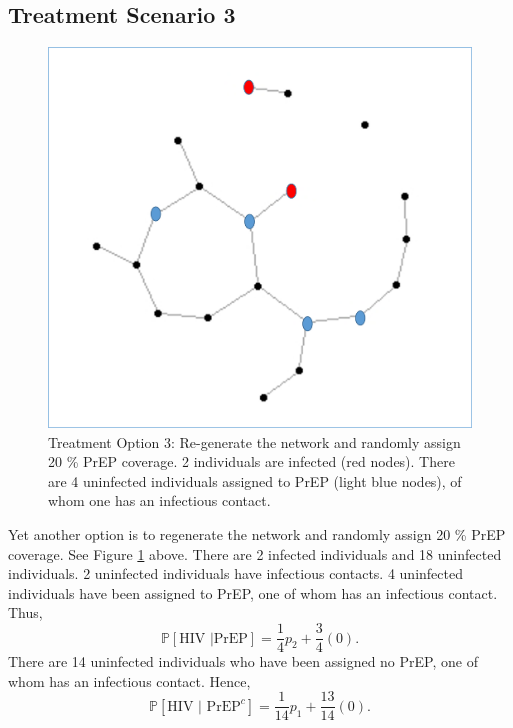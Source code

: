 \documentclass{article}
\theoremstyle{definition}
\begin{document}
\subsection{Treatment Scenario 3}
\begin{figure}[H]
    \centering
    \includegraphics[scale=0.5]{Figures/Network Example 5.png}
    \caption{Treatment Option 3: Re-generate the network and randomly assign 20 \% PrEP coverage. 2 individuals are infected (red nodes). There are 4 uninfected individuals assigned to PrEP (light blue nodes), of whom one has an infectious contact. }
    \label{fig:Figure 6}
\end{figure}

Yet another option is to regenerate the network and randomly assign 20 \% PrEP coverage. See Figure \ref{fig:Figure 6} above. There are 2 infected individuals and 18 uninfected individuals. 2 uninfected individuals have infectious contacts. 4 uninfected individuals have been assigned to PrEP, one of whom has an infectious contact. Thus, $$\mathbb{P}\left[\text{HIV } \vert \text{PrEP}\right]=\frac{1}{4}p_{2}+\frac{3}{4}\left(0\right).$$
There are 14 uninfected individuals who have been assigned no PrEP, one of whom has an infectious contact. Hence, $$\mathbb{P}\left[\text{HIV } \vert \text{ PrEP}^{c}\right]=\frac{1}{14}p_{1}+\frac{13}{14}\left(0\right).$$
\end{document}
